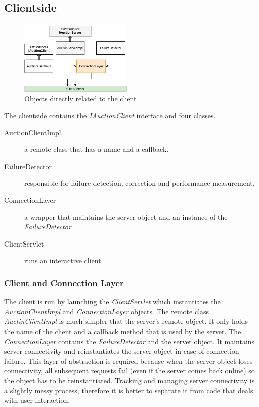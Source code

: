 \documentclass[10pt]{article}
\begin{document}
\subsection{Clientside}
\begin{figure}
  \begin{flushright}
    \includegraphics[width=0.48\textwidth]{client.png}
  \end{flushright}
  \caption{Objects directly related to the client}
\end{figure}
The clientside contains the \textit{IAuctionClient} interface and four classes.
\begin{description}
\item [AuctionClientImpl] a remote class that has a name and a callback.
\item [FailureDetector] responsible for failure detection, correction and performance measurement.
\item [ConnectionLayer] a wrapper that maintains the server object and an instance of the \textit{FailureDetector}
\item [ClientServlet] runs an interactive client
\end{description}
\subsubsection{Client and Connection Layer}
The client is run by launching the \textit{ClientServlet} which instantiates the \textit{AuctionClientImpl} and \textit{ConnectionLayer} objects. The remote class \textit{AuctinClientImpl} is much simpler that the server's remote object. It only holds the name of the client and a callback method that is used by the server. The \textit{ConnectionLayer} contains the \textit{FailureDetector} and the server object. It maintains server connectivity and reinstantiates the server object in case of connection failure. This layer of abstraction is required because when the server object loses connectivity, all subsequent requests fail (even if the server comes back online) so the object has to be reinstantiated. Tracking and managing server connectivity is a slightly messy process, therefore it is better to separate it from code that deals with user interaction.
\end{document}
